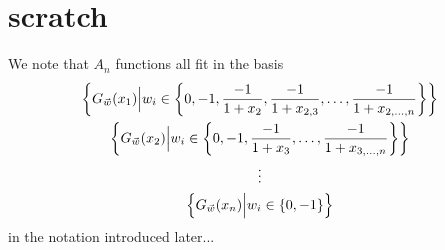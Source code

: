 \documentclass[11pt]{article}
\begin{document}


\iffalse

\section{scratch}

We note that $A_n$ functions all fit in the basis
\begin{gather}
\left\{G_{\vec{\hspace{.0cm} w}}(x_1) \Big| w_i \in \left\{0, - 1, \frac{-1}{1 + x_2}, \frac{-1}{1 + x_{2,3}}, \dots , \frac{-1}{1 + x_{2,\dots,n}} \right\} \right\} \nonumber \\
\left\{G_{\vec{\hspace{.0cm} w}}(x_2) \Big| w_i \in \left\{0, - 1, \frac{-1}{1 + x_3}, \dots , \frac{-1}{1 + x_{3,\dots,n}} \right\} \right\} \\
\vdots \nonumber \\ 
\left\{G_{\vec{\hspace{.0cm} w}}(x_n) \Big| w_i \in \left\{0, - 1 \right\} \right\} \nonumber
\end{gather}
in the notation introduced later...
\end{document}
